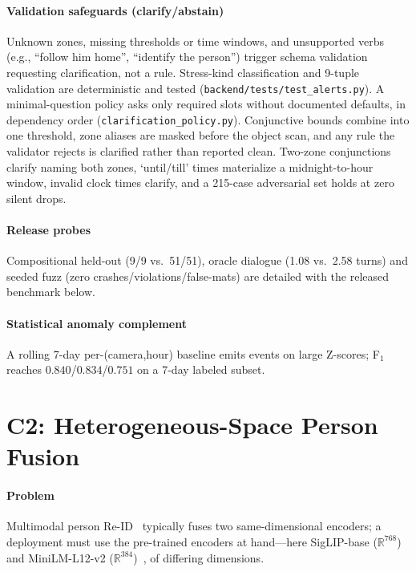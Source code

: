 ﻿\documentclass[conference]{IEEEtran}
\theoremstyle{plain}
\begin{document}
\paragraph*{Validation safeguards (clarify/abstain)}
Unknown zones, missing thresholds or time windows, and unsupported verbs (e.g., ``follow him home'', ``identify the person'') trigger schema validation requesting clarification, not a rule. Stress-kind classification and 9-tuple validation are deterministic and tested (\texttt{backend/\allowbreak tests/\allowbreak test\_\allowbreak alerts.py}). A minimal-question policy asks only required slots without documented defaults, in dependency order (\texttt{clarification\_\allowbreak policy.py}). Conjunctive bounds combine into one threshold, zone aliases are masked before the object scan, and any rule the validator rejects is clarified rather than reported clean. Two-zone conjunctions clarify naming both zones, `until/till' times materialize a midnight-to-hour window, invalid clock times clarify, and a 215-case adversarial set holds at zero silent drops.

\paragraph*{Release probes} Compositional held-out (9/9 vs.\ 51/51), oracle dialogue (1.08 vs.\ 2.58 turns) and seeded fuzz (zero crashes/violations/false-mats) are detailed with the released benchmark below.

\paragraph*{Statistical anomaly complement} A rolling 7-day per-(camera,hour) baseline emits events on large Z-scores; F$_1$ reaches $0.840$/$0.834$/$0.751$ on a 7-day labeled subset.

\section{C2: Heterogeneous-Space Person Fusion}\label{sec:fusion}

\paragraph*{Problem}
Multimodal person Re-ID~\cite{b32} typically fuses two same-dimensional encoders; a deployment must use the pre-trained encoders at hand---here SigLIP-base ($\mathbb{R}^{768}$)~\cite{b24} and MiniLM-L12-v2 ($\mathbb{R}^{384}$)~\cite{b23}, of differing dimensions.
\end{document}
